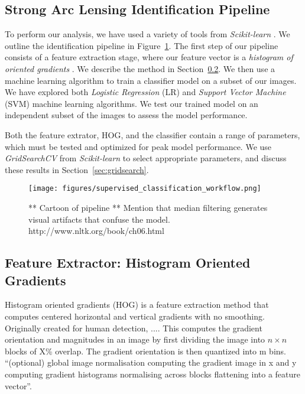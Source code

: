 \documentclass{emulateapj}
\begin{document}
\subsection{Strong Arc Lensing Identification Pipeline}

To perform our analysis, we have used a variety of tools from {\em
  Scikit-learn} \citep{pedregosa_etal12}.  We outline the
identification pipeline in Figure~\ref{fig:pipeline}.  The first step
of our pipeline consists of a feature extraction stage, where our
feature vector is a {\em histogram of oriented gradients}
\citep{dalalandtriggs_05}.  We describe the method in
Section~\ref{sec:hog}.  We then use a machine learning algorithm to
train a classifier model on a subset of our images.  We have explored
both {\em Logistic Regression} (LR) and {\em Support Vector Machine}
(SVM) machine learning algorithms.  We test our trained model on an
independent subset of the images to assess the model performance.

Both the feature extrator, HOG, and the classifier contain a range of
parameters, which must be tested and optimized for peak model
performance.  We use {\em GridSearchCV} from {\em Scikit-learn} to
select appropriate parameters, and discuss these results in
Section~\ref{sec:gridsearch}.

\begin{figure}[t]\label{fig:pipeline}
\begin{center}
\texttt{[image: figures/supervised\_classification\_workflow.png]}
\caption{** Cartoon of pipeline ** Mention that median filtering generates
visual artifacts that confuse the model. http://www.nltk.org/book/ch06.html}
\end{center}
\end{figure}

\subsection{Feature Extractor: Histogram Oriented Gradients}\label{sec:hog}
Histogram oriented gradients (HOG) is a feature extraction method that
computes centered horizontal and vertical gradients with no smoothing.
Originally created for human detection, .... This computes the
gradient orientation and magnitudes in an image by first dividing the
image into $n\times n$ blocks of X\% overlap.  The gradient
orientation is then quantized into m bins. ``(optional) global image
normalisation computing the gradient image in x and y computing
gradient histograms normalising across blocks flattening into a
feature vector''\citep{dalalandtriggs_05}.
\end{document}
